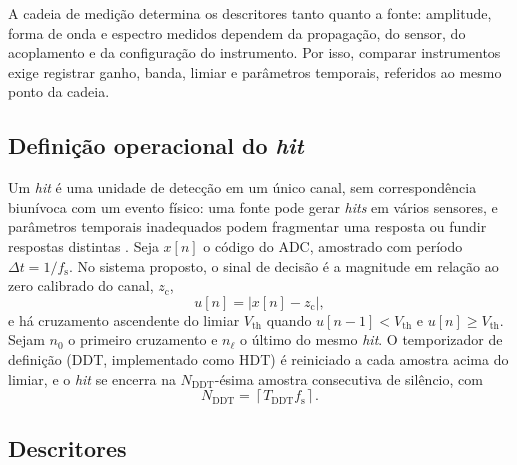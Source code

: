 
A cadeia de medição determina os descritores tanto quanto a fonte: amplitude, forma de onda e espectro medidos dependem da propagação, do sensor, do acoplamento e da configuração do instrumento. Por isso, comparar instrumentos exige registrar ganho, banda, limiar e parâmetros temporais, referidos ao mesmo ponto da cadeia.

\subsection{Definição operacional do \textit{hit}}
\label{subsec:formalizacao_hit}

Um \textit{hit} é uma unidade de detecção em um único canal, sem correspondência biunívoca com um evento físico: uma fonte pode gerar \textit{hits} em vários sensores, e parâmetros temporais inadequados podem fragmentar uma resposta ou fundir respostas distintas \cite{unnthorsson2013}. Seja \(x[n]\) o código do ADC, amostrado com período \(\Delta t = 1/f_{\mathrm{s}}\). No sistema proposto, o sinal de decisão é a magnitude em relação ao zero calibrado do canal, \(z_{\mathrm{c}}\),
\begin{equation}
	u[n] = \left| x[n] - z_{\mathrm{c}} \right|,
	\label{eq:sinal_decisao}
\end{equation}
e há cruzamento ascendente do limiar \(V_{\mathrm{th}}\) quando \(u[n-1] < V_{\mathrm{th}}\) e \(u[n] \geq V_{\mathrm{th}}\). Sejam \(n_0\) o primeiro cruzamento e \(n_\ell\) o último do mesmo \textit{hit}. O temporizador de definição (DDT, implementado como HDT) é reiniciado a cada amostra acima do limiar, e o \textit{hit} se encerra na \(N_{\mathrm{DDT}}\)-ésima amostra consecutiva de silêncio, com
\begin{equation}
	N_{\mathrm{DDT}} = \left\lceil T_{\mathrm{DDT}} f_{\mathrm{s}} \right\rceil.
	\label{eq:ddt_amostras}
\end{equation}

\subsection{Descritores}
\label{subsec:descritores_hit}
\label{v2:subsec:energia_ea}

